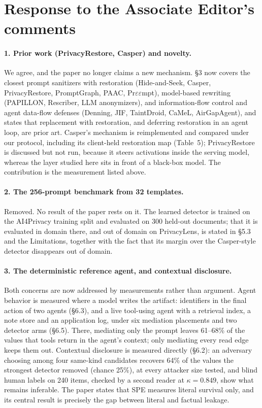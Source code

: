 \documentclass[10pt]{article}
\begin{document}
\section*{Response to the Associate Editor's comments}

\paragraph{1. Prior work (PrivacyRestore, Casper) and novelty.}
We agree, and the paper no longer claims a new mechanism. \S3 now covers the closest prompt sanitizers with
restoration (Hide-and-Seek, Casper, PrivacyRestore, PromptGraph, PAAC, Pr$\varepsilon\varepsilon$mpt), model-based
rewriting (PAPILLON, Rescriber, LLM anonymizers), and information-flow control and agent data-flow defenses
(Denning, JIF, TaintDroid, CaMeL, AirGapAgent), and states that replacement with restoration, and deferring
restoration in an agent loop, are prior art. Casper's mechanism is reimplemented and compared under our protocol,
including its client-held restoration map (Table~5); PrivacyRestore is discussed but not run, because it steers
activations inside the serving model, whereas the layer studied here sits in front of a black-box model. The
contribution is the measurement listed above.

\paragraph{2. The 256-prompt benchmark from 32 templates.}
Removed. No result of the paper rests on it. The learned detector is trained on the AI4Privacy training split and
evaluated on 300 held-out documents; that it is evaluated in domain there, and out of domain on PrivacyLens, is
stated in \S5.3 and the Limitations, together with the fact that its margin over the Casper-style detector
disappears out of domain.

\paragraph{3. The deterministic reference agent, and contextual disclosure.}
Both concerns are now addressed by measurements rather than argument. Agent behavior is measured where a model
writes the artifact: identifiers in the final action of two agents (\S6.3), and a live tool-using agent with a
retrieval index, a note store and an application log, under six mediation placements and two detector arms
(\S6.5). There, mediating only the prompt leaves 61--68\% of the values that tools return in the agent's context;
only mediating every read edge keeps them out. Contextual disclosure is measured directly (\S6.2): an adversary
choosing among four same-kind candidates recovers 64\% of the values the strongest detector removed (chance 25\%),
at every attacker size tested, and blind human labels on 240 items, checked by a second reader at
$\kappa=0.849$, show what remains inferable. The paper states that SPE measures literal survival only, and its
central result is precisely the gap between literal and factual leakage.
\end{document}
